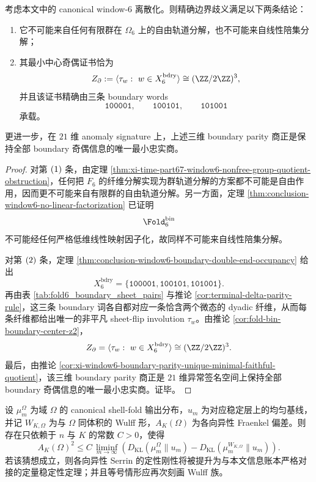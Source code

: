 \begin{proposition}\label{prop:conclusion-serrin-window6-minimal-anomaly-certificate}
考虑本文中的 canonical window-\(6\) 离散化。则精确边界歧义满足以下两条结论：
\begin{enumerate}
  \item 它不可能来自任何有限群在 \(\Omega_6\) 上的自由轨道分解，也不可能来自线性陪集分解；
  \item 其最小中心奇偶证书恰为
  \[
  Z_{\partial}:=\langle \tau_w:\ w\in X_6^{\mathrm{bdry}}\rangle\cong (\ZZ/2\ZZ)^3,
  \]
  并且该证书精确由三条 boundary words
  \[
  \texttt{100001},\qquad \texttt{100101},\qquad \texttt{101001}
  \]
  承载。
\end{enumerate}
更进一步，在 \(21\) 维 anomaly signature 上，上述三维 boundary parity 商正是保持全部 boundary 奇偶信息的唯一最小忠实商。
\end{proposition}
\begin{proof}
对第 \(\textup{(1)}\) 条，由定理 \ref{thm:xi-time-part67-window6-nonfree-group-quotient-obstruction}，任何把 \(F_6\) 的纤维分解实现为群轨道分解的方案都不可能是自由作用，因而更不可能来自有限群的自由轨道分解。另一方面，定理 \ref{thm:conclusion-window6-no-linear-factorization} 已证明
\[
\Fold_6^{\mathrm{bin}}
\]
不可能经任何严格低维线性映射因子化，故同样不可能来自线性陪集分解。

对第 \(\textup{(2)}\) 条，定理 \ref{thm:conclusion-window6-boundary-double-end-occupancy} 给出
\[
X_6^{\mathrm{bdry}}
=
\{\texttt{100001},\texttt{100101},\texttt{101001}\}.
\]
再由表 \ref{tab:fold6_boundary_sheet_pairs} 与推论 \ref{cor:terminal-delta-parity-rule}，这三条 boundary 词各自都对应一条恰含两个微态的 dyadic 纤维，从而每条纤维都给出唯一的非平凡 sheet-flip involution \(\tau_w\)。由推论 \ref{cor:fold-bin-boundary-center-z2}，
\[
Z_{\partial}
=
\langle \tau_w:\ w\in X_6^{\mathrm{bdry}}\rangle
\cong
(\ZZ/2\ZZ)^3.
\]
最后，由推论 \ref{cor:xi-window6-boundary-parity-unique-minimal-faithful-quotient}，该三维 boundary parity 商正是 \(21\) 维异常签名空间上保持全部 boundary 奇偶信息的唯一最小忠实商。证毕。
\end{proof}

\begin{conjecture}\label{conj:conclusion-serrin-kl-gap-controls-fraenkel-asymmetry}
设 \(\mu_m^\Omega\) 为域 \(\Omega\) 的 canonical shell-fold 输出分布，\(u_m\) 为对应稳定层上的均匀基线，并记 \(W_{K,\Omega}\) 为与 \(\Omega\) 同体积的 Wulff 形，\(A_K(\Omega)\) 为各向异性 Fraenkel 偏差。则存在只依赖于 \(n\) 与 \(K\) 的常数 \(C>0\)，使得
\[
A_K(\Omega)^2
\le
C\,
\liminf_{m\to\infty}
\left(
D_{\mathrm{KL}}(\mu_m^\Omega\|u_m)
-
D_{\mathrm{KL}}(\mu_m^{W_{K,\Omega}}\|u_m)
\right).
\]
若该猜想成立，则各向异性 Serrin 的定性刚性将被提升为与本文信息账本严格对接的定量稳定性定理；并且等号情形应再次刻画 Wulff 族。
\end{conjecture}

